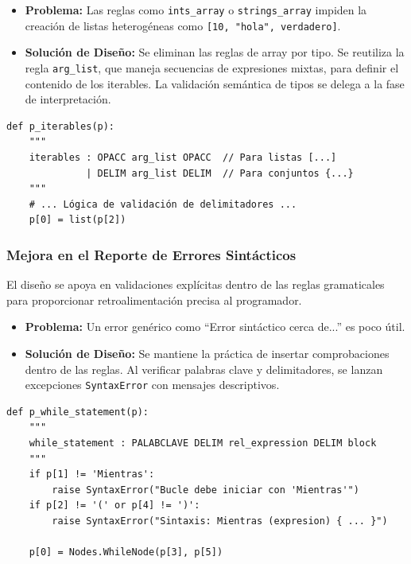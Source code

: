 \documentclass{article}
\begin{document}
\begin{itemize}
    \item \textbf{Problema:} Las reglas como \texttt{ints\_array} o \texttt{strings\_array} impiden la creación de listas heterogéneas como \texttt{[10, "hola", verdadero]}.
    
    \item \textbf{Solución de Diseño:} Se eliminan las reglas de array por tipo. Se reutiliza la regla \texttt{arg\_list}, que maneja secuencias de expresiones mixtas, para definir el contenido de los iterables. La validación semántica de tipos se delega a la fase de interpretación.
\end{itemize}

\begin{lstlisting}[style=mypython, caption={Regla simplificada para iterables que permite elementos mixtos.}]
def p_iterables(p):
    """
    iterables : OPACC arg_list OPACC  // Para listas [...]
              | DELIM arg_list DELIM  // Para conjuntos {...}
    """
    # ... Lógica de validación de delimitadores ...
    p[0] = list(p[2])
\end{lstlisting}

\subsubsection{Mejora en el Reporte de Errores Sintácticos}
El diseño se apoya en validaciones explícitas dentro de las reglas gramaticales para proporcionar retroalimentación precisa al programador.

\begin{itemize}
    \item \textbf{Problema:} Un error genérico como ``Error sintáctico cerca de...'' es poco útil.
    
    \item \textbf{Solución de Diseño:} Se mantiene la práctica de insertar comprobaciones dentro de las reglas. Al verificar palabras clave y delimitadores, se lanzan excepciones \texttt{SyntaxError} con mensajes descriptivos.
\end{itemize}

\begin{lstlisting}[style=mypython, caption={Ejemplo de validación explícita en la regla para el bucle \texttt{Mientras}.}]
def p_while_statement(p):
    """
    while_statement : PALABCLAVE DELIM rel_expression DELIM block
    """
    if p[1] != 'Mientras':
        raise SyntaxError("Bucle debe iniciar con 'Mientras'")
    if p[2] != '(' or p[4] != ')':
        raise SyntaxError("Sintaxis: Mientras (expresion) { ... }")
    
    p[0] = Nodes.WhileNode(p[3], p[5])
\end{lstlisting}
\end{document}
